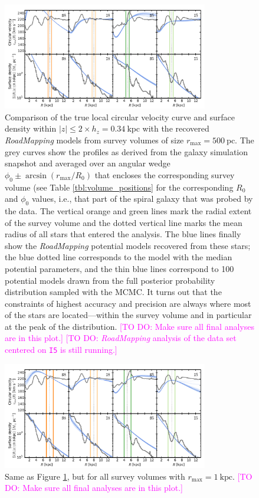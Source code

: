 \documentclass[iop,revtex4,numberedappendix,appendixfloats]{emulateapj}
\newcommand{\RM}{{\sl RoadMapping}}
\newcommand{\Wilma}[1]{\textcolor{Magenta}{#1}}
\begin{document}
\begin{appendix}
\begin{figure}[!htbp]
\centering
\includegraphics[width=0.8\textwidth]{fig/MNdHHdiffSph2_vcirc_surfdens_500pcSuite.pdf}
\caption{Comparison of the true local circular velocity curve and surface density within $|z| \leq 2 \times h_z = 0.34~\text{kpc}$ with the recovered \RM{} models from survey volumes of size $r_\text{max}=500~\text{pc}$. The grey curves show the profiles as derived from the galaxy simulation snapshot and averaged over an angular wedge $\phi_0\pm\arcsin(r_\text{max}/R_0)$ that encloses the corresponding survey volume (see Table \ref{tbl:volume_positions} for the corresponding $R_0$ and $\phi_0$ values, i.e., that part of the spiral galaxy that was probed by the data. The vertical orange and green lines mark the radial extent of the survey volume and the dotted vertical line marks the mean radius of all stars that entered the analysis. The blue lines finally show the \RM{} potential models recovered from these stars; the blue dotted line corresponds to the model with the median potential parameters, and the thin blue lines correspond to 100 potential models drawn from the full posterior probability distribution sampled with the MCMC. It turns out that the constraints of highest accuracy and precision are always where most of the stars are located---within the survey volume and in particular at the peak of the distribution. \Wilma{[TO DO: Make sure all final analyses are in this plot.]} \Wilma{[TO DO: \RM{} analysis of the data set centered on \texttt{I5} is still running.]}}
\label{fig:500pcSuite}
\end{figure}

\begin{figure}[!htbp]
\centering
\includegraphics[width=0.8\textwidth]{fig/MNdHHdiffSph2_vcirc_surfdens_1kpcSuite.pdf}
\caption{Same as Figure \ref{fig:500pcSuite}, but for all survey volumes with $r_\text{max}=1~\text{kpc}$. \Wilma{[TO DO: Make sure all final analyses are in this plot.]}}
\label{fig:1kpcSuite}
\end{figure}


\end{appendix}
\end{document}
